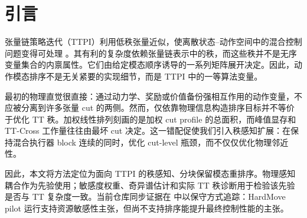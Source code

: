 \section{引言}

张量链策略迭代（TTPI）利用低秩张量近似，使离散状态--动作空间中的混合控制问题变得可处理
\cite{shetty2024generalized,oseledets2011tensor}。其有利的复杂度依赖张量链表示中的秩，而这些秩并不是无序变量集合的内禀属性。它们由给定模态顺序诱导的一系列矩阵展开决定。因此，动作模态排序不是无关紧要的实现细节，而是 TTPI 中的一等算法变量。

最初的物理直觉很直接：通过动力学、奖励或价值备份强相互作用的动作变量，不应被分离到许多张量 cut 的两侧。然而，仅依靠物理信息构造排序目标并不等价于优化 TT 秩。加权线性排列刻画的是加权 cut profile 的总面积，而峰值显存和 TT-Cross 工作量往往由最坏 cut 决定。这一错配促使我们引入秩感知扩展：在保持混合执行器 block 连续的同时，优化 cut-level 瓶颈，而不仅仅优化物理邻近性。

因此，本文将方法定位为面向 TTPI 的秩感知、分块保留模态重排序。物理感知耦合作为先验使用；敏感度权重、奇异谱估计和实际 TT 秩诊断用于检验该先验是否与 TT 复杂度一致。当前仓库同步证据在  中以保守方式追踪：HardMove pilot 运行支持资源敏感性主张，但尚不支持排序能提升最终控制性能的主张。

